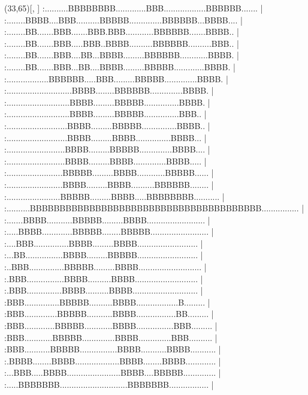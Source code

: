 
\newsavebox{\CalH}  %
\newcommand{\ScriptH}%
{\raisebox{-0.5 pt}{\SH}\kern 1 pt}%
\sprite{\SH}(33,65)[\wd\CalH, \ht\CalH]     %
:..........BBBBBBBB.............BBB..................BBBBBB....... |
:........BBBB....BBB..........BBBBB..............BBBBBB...BBBB.... |
:........BB.......BBB.......BBB.BBB............BBBBBB.......BBBB.. |
:........BB.......BBB.....BBB..BBBB..........BBBBBB..........BBB.. |
:........BB.......BBB....BB...BBBB.........BBBBBB............BBBB. |
:........BB.......BBB...BB....BBBB.........BBBBB.............BBBB. |
:..................BBBBBB.....BBB.........BBBBB..............BBBB. |
:............................BBBB........BBBBBB..............BBBB. |
:...........................BBBB.........BBBBB...............BBBB. |
:...........................BBBB.........BBBBB...............BBB.. |
:..........................BBBB.........BBBBB...............BBBB.. |
:..........................BBBB.........BBBB...............BBBB... |
:.........................BBBB.........BBBBB..............BBBB.... |
:.........................BBBB.........BBBB..............BBBB..... |
:........................BBBBB.........BBBB............BBBBB...... |
:........................BBBB.........BBBB..........BBBBBB........ |
:.......................BBBBB.........BBBB.....BBBBBBBB........... |
:..........BBBBBBBBBBBBBBBBBBBBBBBBBBBBBBBBBBBBBBB................ |
:.......BBBB...........BBBBB.........BBBB......................... |
:.....BBBB.............BBBBB........BBBBB......................... |
:....BBB...............BBBB.........BBBB.......................... |
:...BB................BBBB.........BBBBB.......................... |
:..BBB...............BBBBB.........BBBB........................... |
:.BBB................BBBB..........BBBB........................... |
:.BBB...............BBBB..........BBBB............................ |
:BBB...............BBBBB..........BBBB..................B......... |
:BBB..............BBBBB...........BBBB.................BB......... |
:BBB.............BBBBB............BBBB................BBB......... |
:BBB............BBBBB..............BBBB..............BBB.......... |
:BBB...........BBBBB................BBBB...........BBBB........... |
:.BBBB........BBBB...................BBBB........BBBB............. |
:...BBB.....BBBB.......................BBBB....BBBBB.............. |
:.....BBBBBBB.............................BBBBBBB................. |
\endsprite
     
